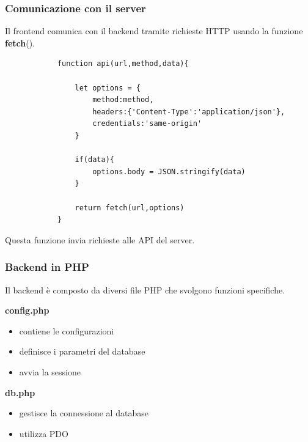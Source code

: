 \documentclass{beamer}
\begin{document}
	
	\begin{frame}[fragile]
		\frametitle{Comunicazione con il server}
		
		Il frontend comunica con il backend tramite
		richieste HTTP usando la funzione \textbf{fetch}().
		
		\begin{lstlisting}
			function api(url,method,data){
				
				let options = {
					method:method,
					headers:{'Content-Type':'application/json'},
					credentials:'same-origin'
				}
				
				if(data){
					options.body = JSON.stringify(data)
				}
				
				return fetch(url,options)
			}
		\end{lstlisting}
		
		Questa funzione invia richieste alle API del server.
		
	\end{frame}
	
	
	\begin{frame}
		\frametitle{Backend in PHP}
		
		Il backend è composto da diversi file PHP che svolgono
		funzioni specifiche.
		
		\bigskip
		
		\textbf{config.php}
		
		\begin{itemize}
			\item contiene le configurazioni
			\item definisce i parametri del database
			\item avvia la sessione
		\end{itemize}
		
		\bigskip
		
		\textbf{db.php}
		
		\begin{itemize}
			\item gestisce la connessione al database
			\item utilizza PDO
		\end{itemize}
		
	\end{frame}
	
	
\end{document}
